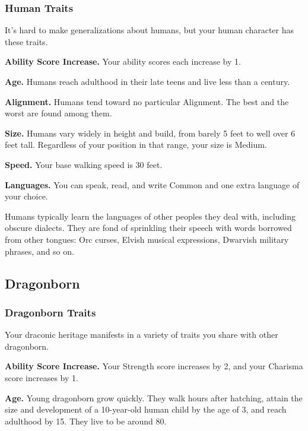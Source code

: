 \hypertarget{human-traits}{%
\subsubsection{Human Traits}\label{human-traits}}

It's hard to make generalizations about humans, but your human character
has these traits.

\textbf{Ability Score Increase.} Your ability scores each increase by 1.

\textbf{Age.} Humans reach adulthood in their late teens and live less
than a century.

\textbf{Alignment.} Humans tend toward no particular Alignment. The best
and the worst are found among them.

\textbf{Size.} Humans vary widely in height and build, from barely 5
feet to well over 6 feet tall. Regardless of your position in that
range, your size is Medium.

\textbf{Speed.} Your base walking speed is 30 feet.

\textbf{Languages.} You can speak, read, and write Common and one extra
language of your choice.

Humans typically learn the languages of other peoples they deal with,
including obscure dialects. They are fond of sprinkling their speech
with words borrowed from other tongues: Orc curses, Elvish musical
expressions, Dwarvish military phrases, and so on.

\hypertarget{dragonborn}{%
\subsection{Dragonborn}\label{dragonborn}}

\hypertarget{dragonborn-traits}{%
\subsubsection{Dragonborn Traits}\label{dragonborn-traits}}

Your draconic heritage manifests in a variety of traits you share with
other dragonborn.

\textbf{Ability Score Increase.} Your Strength score increases by 2, and
your Charisma score increases by 1.

\textbf{Age.} Young dragonborn grow quickly. They walk hours after
hatching, attain the size and development of a 10-year-old human child
by the age of 3, and reach adulthood by 15. They live to be around 80.

